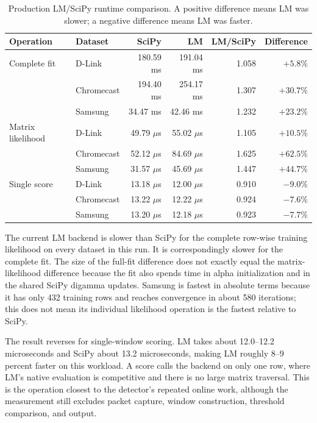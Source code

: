 \documentclass[11pt]{article}
\begin{document}
\begin{table}[htbp]
\centering
\small
\caption{Production LM/SciPy runtime comparison. A positive difference means
LM was slower; a negative difference means LM was faster.}
\label{tab:section-two-runtime}
\begin{tabular}{llrrrr}
\toprule
Operation & Dataset & SciPy & LM & LM/SciPy & Difference \\
\midrule
Complete fit & D-Link & 180.59 ms & 191.04 ms & 1.058 & $+5.8\%$ \\
& Chromecast & 194.40 ms & 254.17 ms & 1.307 & $+30.7\%$ \\
& Samsung & 34.47 ms & 42.46 ms & 1.232 & $+23.2\%$ \\
\addlinespace
Matrix likelihood & D-Link & 49.79 $\mu$s & 55.02 $\mu$s & 1.105 & $+10.5\%$ \\
& Chromecast & 52.12 $\mu$s & 84.69 $\mu$s & 1.625 & $+62.5\%$ \\
& Samsung & 31.57 $\mu$s & 45.69 $\mu$s & 1.447 & $+44.7\%$ \\
\addlinespace
Single score & D-Link & 13.18 $\mu$s & 12.00 $\mu$s & 0.910 & $-9.0\%$ \\
& Chromecast & 13.22 $\mu$s & 12.22 $\mu$s & 0.924 & $-7.6\%$ \\
& Samsung & 13.20 $\mu$s & 12.18 $\mu$s & 0.923 & $-7.7\%$ \\
\bottomrule
\end{tabular}
\end{table}

The current LM backend is slower than SciPy for the complete row-wise training
likelihood on every dataset in this run. It is correspondingly slower for the
complete fit. The size of the full-fit difference does not exactly equal the
matrix-likelihood difference because the fit also spends time in alpha
initialization and in the shared SciPy digamma updates. Samsung is fastest in
absolute terms because it has only 432 training rows and reaches convergence in
about 580 iterations; this does not mean its individual likelihood operation is
the fastest relative to SciPy.

The result reverses for single-window scoring. LM takes about 12.0--12.2
microseconds and SciPy about 13.2 microseconds, making LM roughly 8--9 percent
faster on this workload. A score calls the backend on only one row, where LM's
native evaluation is competitive and there is no large matrix traversal. This
is the operation closest to the detector's repeated online work, although the
measurement still excludes packet capture, window construction, threshold
comparison, and output.
\end{document}
